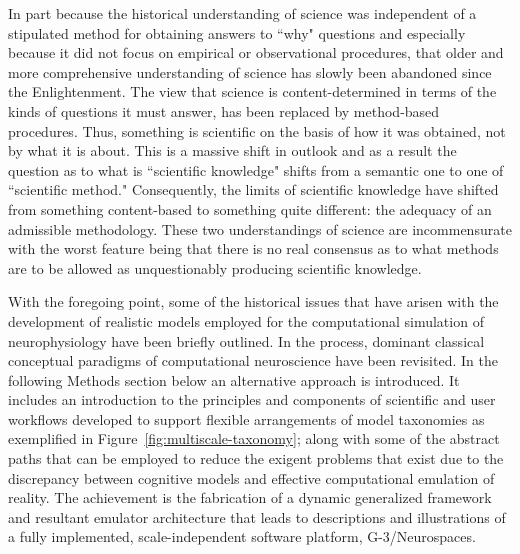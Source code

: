 \documentclass[11pt,3p,twocolumn]{JMN}
\begin{document}
In part because the historical understanding of science was independent of a stipulated method for obtaining answers to ``why" questions and especially because it did not focus on empirical or observational procedures, that older and more comprehensive understanding of science has slowly been abandoned since the Enlightenment. The view that science is content-determined in terms of the kinds of questions it must answer, has been replaced by method-based procedures. Thus, something is scientific on the basis of how it was obtained, not by what it is about. This is a massive shift in outlook and as a result the question as to what is ``scientific knowledge" shifts from a semantic one to one of ``scientific method." Consequently, the limits of scientific knowledge have shifted from something content-based to something quite different: the adequacy of an admissible methodology. These two understandings of science are incommensurate with the worst feature being that there is no real consensus as to what methods are to be allowed as unquestionably producing scientific knowledge.

With the foregoing point, some of the historical issues that have arisen with the development of realistic models employed for the computational simulation of neurophysiology have been briefly outlined. In the process, dominant classical conceptual paradigms of computational neuroscience have been revisited. In the following Methods section below an alternative approach is introduced. It includes an introduction to the principles and components of scientific and user workflows developed to support flexible arrangements of model taxonomies as exemplified in Figure~\ref{fig:multiscale-taxonomy}; along with some of the abstract paths that can be employed to reduce the exigent problems that exist due to the discrepancy between  cognitive models and effective computational emulation of reality. The achievement is the fabrication of a dynamic generalized framework and resultant emulator architecture that leads to descriptions and illustrations of a fully implemented, scale-independent software platform, G-3/Neurospaces.


\end{document}
